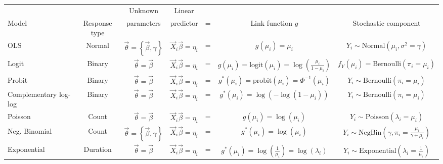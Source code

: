 \documentclass[11pt]{article}
\newcommand{\logit}{\text{logit}}
\newcommand{\bblue}[1]{\textbf{\textcolor{blue}{#1}}}
\begin{document}


\begin{sidewaystable}[!htbp]
\small
\centering
\begin{tabular}{lcccccc}
 & & Unknown & Linear \\
Model & Response type & parameters & predictor & = & Link function $g$ & Stochastic component \\
\hline

OLS & 
	Normal & 
	$\vec\theta=\left\{\vec\beta,\gamma\right\}$ & 
	$\vec{X}_i\vec\beta=\eta_i$ & 
	= &
	$g(\mu_i) = \mu_i$ & 
	$Y_i \sim \text{Normal}(\mu_i,\sigma^2 = \gamma)$ \\

Logit & 
	Binary & 
	$\vec\theta=\vec\beta$ & 
	$\vec{X}_i\vec\beta=\eta_i$ & 
	= &
	$g(\mu_i) = \logit(\mu_i) = \log\left(\frac{\mu_i}{1-\mu_i}\right)$ & 
	$f_Y(\mu_i) = \text{Bernoulli}(\pi_i = \mu_i)$ \\

Probit & 
	Binary & 
	$\vec\theta=\vec\beta$ & 
	$\vec{X}_i\vec\beta=\eta_i$ & 
	= &
	$g^*(\mu_i) = \text{probit}(\mu_i) = \Phi^{-1}(\mu_i)$ & 
	$Y_i \sim \text{Bernoulli}(\pi_i = \mu_i)$ \\
	
Complementary log-log & 
	Binary & 
	$\vec\theta=\vec\beta$ & 
	$\vec{X}_i\vec\beta=\eta_i$ & 
	= &
	$g^*(\mu_i) = \log(-\log(1-\mu_i)) $ & 
	$Y_i \sim \text{Bernoulli}(\pi_i = \mu_i)$ \\
	
Poisson & 
	Count & 
	$\vec\theta=\vec\beta$ & 
	$\vec{X}_i\vec\beta=\eta_i$ & 
	= &
	$g(\mu_i) = \log(\mu_i)$ & 
	$Y_i \sim \text{Poisson}(\lambda_i = \mu_i)$ \\

Neg. Binomial & 
	Count & $\vec\theta=\left\{\vec\beta,\gamma\right\}$ & 
	$\vec{X}_i\vec\beta=\eta_i$ & 
	= &
	$g^*(\mu_i) = \log(\mu_i)$ & 
	$Y_i \sim \text{NegBin}\left(\gamma, \pi_i = \frac{\mu_i}{\gamma + \mu_i}\right)$ \\

Exponential & 
	Duration & 
	$\vec\theta=\vec\beta$ & 
	$\vec{X}_i\vec\beta=\eta_i$ & 
	= &
	$g^*(\mu_i) = \log\left(\frac{1}{\mu_i}\right) = \log\left(\lambda_i\right)$ & 
	$Y_i \sim \text{Exponential}\left(\lambda_i = \frac{1}{\mu_i}\right)$ \\
	

\end{tabular}
\end{sidewaystable}
\end{document}
